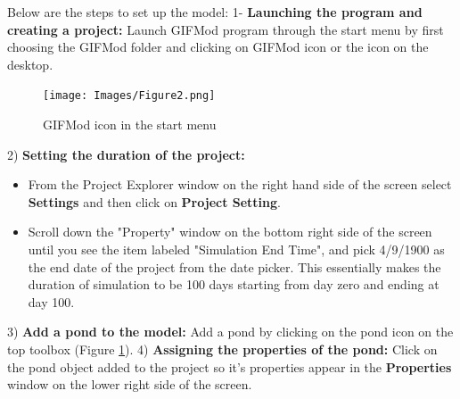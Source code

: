 Below are the steps to set up the model:
1- \textbf{Launching the program and creating a project: } Launch GIFMod program through the start menu by first choosing the GIFMod folder and clicking on GIFMod icon or the icon on the desktop.\\
\begin{figure}[!ht]\label{fig:2}
\begin{center}
\texttt{[image: Images/Figure2.png]} \\
\caption{GIFMod icon in the start menu} 
\end{center}
\end{figure}
2) \textbf{Setting the duration of the project: }
\begin{itemize}
\item From the Project Explorer window on the right hand side of the screen select \textbf{Settings} and then click on \textbf{Project Setting}. 
\item Scroll down the "Property" window on the bottom right side of the screen until you see the item labeled "Simulation End Time", and pick 4/9/1900 as the end date of the project from the date picker. This essentially makes the duration of simulation to be 100 days starting from day zero and ending at day 100.  
\end{itemize}
3) \textbf{Add a pond to the model: } Add a pond by clicking on the pond icon on the top toolbox (Figure \ref{fig:2}).
4) \textbf{Assigning the properties of the pond: }
Click on the pond object added to the project so it's properties appear in the \textbf{Properties} window on the lower right side of the screen. 
